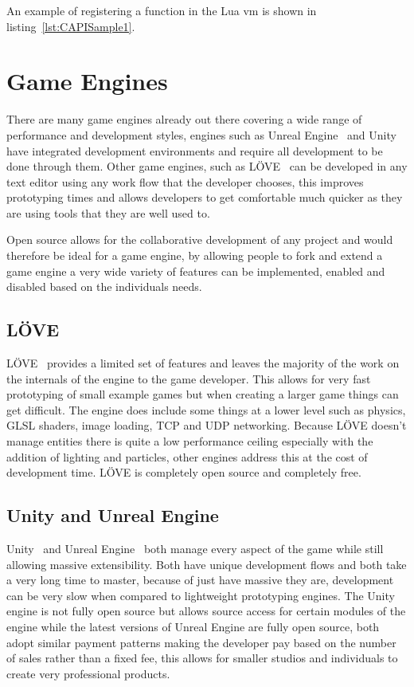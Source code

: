 \documentclass[11pt,a4paper,titlepage]{report}
\begin{document}
	An example of registering a function in the Lua vm is shown in listing~\ref{lst:CAPISample1}.
	

\newpage

\section{Game Engines}
	
	There are many game engines already out there covering a wide range of performance and development styles, engines such as Unreal Engine~\cite{UE} and Unity~\cite{Unity} have integrated development environments and require all development to be done through them. Other game engines, such as LÖVE~\cite{LOVE} can be developed in any text editor using any work flow that the developer chooses, this improves prototyping times and allows developers to get comfortable much quicker as they are using tools that they are well used to.

	Open source allows for the collaborative development of any project and would therefore be ideal for a game engine, by allowing people to fork and extend a game engine a very wide variety of features can be implemented, enabled and disabled based on the individuals needs.

\subsection{LÖVE}
	LÖVE~\cite{LOVE} provides a limited set of features and leaves the majority of the work on the internals of the engine to the game developer. This allows for very fast prototyping of small example games but when creating a larger game things can get difficult. The engine does include some things at a lower level such as physics, GLSL shaders, image loading, TCP and UDP networking. Because LÖVE doesn't manage entities there is quite a low performance ceiling especially with the addition of lighting and particles, other engines address this at the cost of development time. LÖVE is completely open source and completely free.
\subsection{Unity and Unreal Engine}
	Unity~\cite{Unity} and Unreal Engine~\cite{UE} both manage every aspect of the game while still allowing massive extensibility. Both have unique development flows and both take a very long time to master, because of just have massive they are, development can be very slow when compared to lightweight prototyping engines. The Unity engine is not fully open source but allows source access for certain modules of the engine while the latest versions of Unreal Engine are fully open source, both adopt similar payment patterns making the developer pay based on the number of sales rather than a fixed fee, this allows for smaller studios and individuals to create very professional products.
\end{document}
